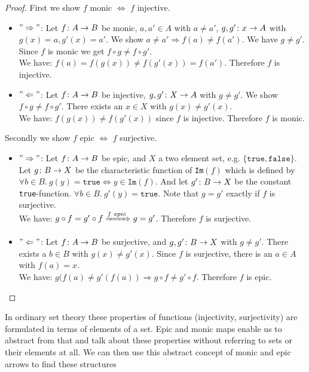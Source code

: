 \begin{proof}
  First we show $f$ monic $\Leftrightarrow$ $f$ injective.
  \begin{itemize}
  \item $"\Rightarrow"$: Let $f \from A \to B$ be monic, $a, a' \in A$ with $a \neq a'$, $g, g' \from {x} \to A$ with $g(x) = a, g'(x) = a'$.
    We show $a \neq a' \Rightarrow f(a) \neq f(a')$.
    We have $g \neq g'$.
    Since $f$ is monic we get $f \circ g \neq f \circ g'$.\\
    We have: $f(a) = f(g(x)) \neq f(g'(x)) = f(a')$. Therefore $f$ is injective.
  \item $"\Leftarrow"$: Let $f \from A \to B$ be injective, $g, g' \from X \to A$ with $g \neq g'$.
    We show $f \circ g \neq f \circ g'$.
    There exists an $x \in X$ with $g(x) \neq g'(x)$.\\
    We have: $f(g(x)) \neq f(g'(x))$ since $f$ is injective.
    Therefore $f$ is monic.
  \end{itemize}
  Secondly we show $f$ epic $\Leftrightarrow$ $f$ surjective.
  \begin{itemize}
  \item $"\Rightarrow"$: Let $f \from A \to B$ be epic, and $X$ a two element set, e.g. $\{ \texttt{true}, \texttt{false}\}$.
    Let $g \from B \to X$ be the characteristic function of \texttt{Im}$(f)$ which is defined by
    $\forall b \in B. \ g(y) = \texttt{true}
    \Leftrightarrow y \in \texttt{Im}(f)$.
    And let $g' \from B \to X$ be the constant \texttt{true}-function.
    $\forall b \in B. \ g'(y) = \texttt{true}$.
    Note that $g = g'$ exactly if $f$ is surjective.\\
    We have: $g \of f = g' \of f \xRightarrow{f \ epic} g = g'$.
    Therefore $f$ is surjective.
  \item $"\Leftarrow"$: Let $f \from A \to B$ be surjective, and $g, g' \from B \to X$ with $g \neq g'$.
    There exists a $b \in B$ with $g(x) \neq g'(x)$.
    Since $f$ is surjective, there is an $a \in A$ with $f(a) = x$.\\
    We have: $g(f(a) \neq g'(f(a)) \Rightarrow g \circ f \neq g' \circ f$.
    Therefore $f$ is epic.
  \end{itemize}
\end{proof}
In ordinary set theory these properties of functions (injectivity, surjectivity) are formulated in terms of elements of a set.
Epic and monic maps enable us to abstract from that and
talk about these properties without referring to sets or their elements at all.
We can then use this abstract concept of monic and epic arrows to find these structures

